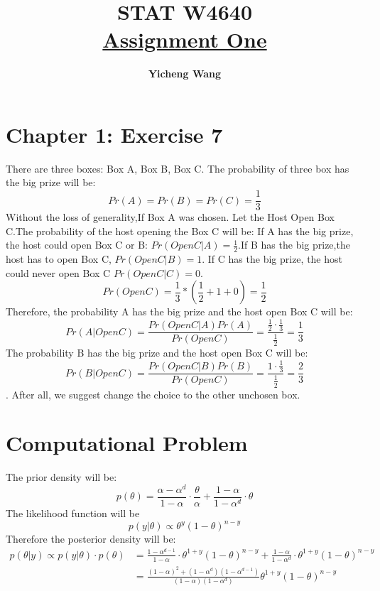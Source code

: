 \documentclass[11pt]{article}
\begin{document}
\title{\Huge \textbf{STAT W4640 }\\
\Large\underline{Assignment One}
}%
\author{ \Large\textbf{Yicheng Wang}}
\maketitle
\section*{Chapter 1: Exercise 7}
There are three boxes: Box A, Box B, Box C. The probability of three box has the big prize will be: $$Pr(A)=Pr(B)=Pr(C)=\frac{1}{3}$$ Without the loss of generality,If Box A was chosen.
Let the Host Open Box C.The probability of the host opening the Box C will be: 
If A has the big prize, the host could open Box C or B: $Pr(Open C|A)=\frac{1}{2}$.If  B has the big prize,the host has to open Box C, $Pr(Open C|B)=1$. If C has the big prize, the host could never open Box C $Pr(Open C|C)=0$.
$$Pr(Open C)=\frac{1}{3}*(\frac{1}{2}+1+0)=\frac{1}{2}$$ 
Therefore,  the probability A has the big prize and the host open Box C will be:$$Pr(A|Open C)=\frac{Pr(Open C|A)Pr(A)}{Pr(Open C)}=\frac{\frac{1}{2}\cdot \frac{1}{3}}{\frac{1}{2}}=\frac{1}{3}$$ 
The probability B has the big prize and the host open Box C will be:$$Pr(B|Open C)=\frac{Pr(Open C|B)Pr(B)}{Pr(Open C)}=\frac{1\cdot \frac{1}{3}}{\frac{1}{2}}=\frac{2}{3}$$. After all, we suggest change the choice to the other unchosen box.
%
\section*{Computational Problem}
The prior density will be:$$p(\theta)= \frac{\alpha-\alpha^d}{1-\alpha}\cdot\frac{\theta}{\alpha}+\frac{1-\alpha}{1-\alpha^d}\cdot\theta $$
The likelihood function will be $$p(y|\theta)\propto \theta^y(1-\theta)^{n-y}$$
Therefore the posterior density will be: 
\begin{align*}
p(\theta|y)\propto p(y|\theta)\cdot p(\theta) &=\frac{1-\alpha^{d-1}}{1-\alpha}\cdot\theta^{1+y}(1-\theta)^{n-y}+\frac{1-\alpha}{1-\alpha^d}\cdot\theta^{1+y}(1-\theta)^{n-y}\\
&=\frac{(1-\alpha)^2+(1-\alpha^d)(1-\alpha^{d-1})}{(1-\alpha)(1-\alpha^d)}\theta^{1+y}(1-\theta)^{n-y}
\end{align*}
\end{document}

